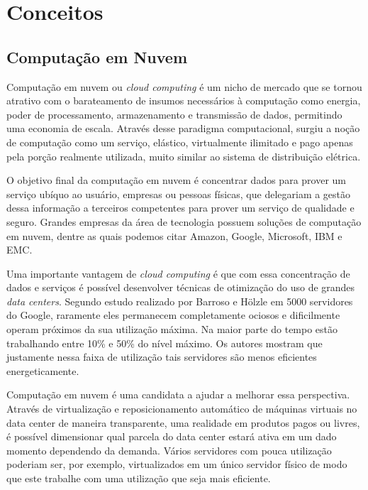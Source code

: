 \chapter{Conceitos}
\label{cap:conceitos}

\section{Computação em Nuvem}
\label{sec:computacao_nuvem}
Computação em nuvem ou \emph{cloud computing} é um nicho de mercado que se tornou atrativo com o
barateamento de insumos necessários à computação como energia, poder de 
processamento, armazenamento e transmissão de dados, permitindo uma economia
de escala. \cite{eecs:above-clouds} Através desse paradigma computacional, 
surgiu a noção de computação como um serviço, elástico, virtualmente ilimitado e
pago apenas pela porção realmente utilizada, muito similar ao sistema de
distribuição elétrica.

O objetivo final da computação em nuvem é concentrar dados para prover um 
serviço ubíquo ao usuário, empresas ou pessoas físicas, que delegariam a gestão
dessa informação a terceiros competentes para prover um serviço de qualidade e 
seguro. Grandes empresas da área de tecnologia possuem soluções de computação em
 nuvem, dentre as quais podemos citar Amazon, Google, Microsoft, IBM e EMC.

Uma importante vantagem de \emph{cloud computing} é que com essa concentração de 
dados e serviços é possível desenvolver técnicas de otimização do uso de grandes
\emph{data centers}. Segundo estudo realizado por Barroso e Hölzle
\cite{barroso:case_energy_proportional} em 5000 servidores do Google, raramente
eles permanecem completamente ociosos e dificilmente operam próximos da sua
utilização máxima. Na maior parte do tempo estão trabalhando entre 10\% e 50\% 
do nível máximo. Os autores mostram que justamente nessa faixa de utilização
tais servidores são menos eficientes energeticamente.

Computação em nuvem é uma
candidata a ajudar a melhorar essa perspectiva. Através de virtualização e
reposicionamento automático de máquinas virtuais no data center de maneira
transparente, uma realidade em produtos pagos ou livres, é possível dimensionar
qual parcela do data center estará ativa em um dado momento dependendo da
demanda. Vários servidores com pouca utilização poderiam ser, por exemplo,
virtualizados em um único servidor físico de modo que este trabalhe com uma
utilização que seja mais eficiente.

